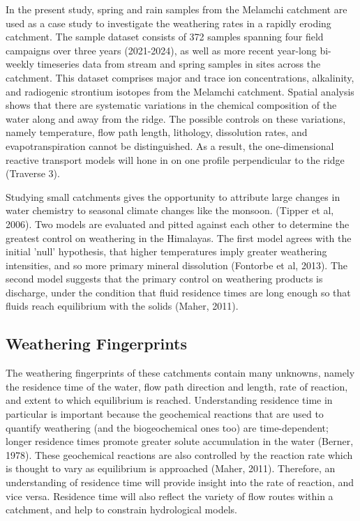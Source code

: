 In the present study, spring and rain samples from the Melamchi catchment are used as a case 
study to investigate the weathering rates in a rapidly eroding catchment. The sample dataset consists of 372 samples spanning four field campaigns over three years (2021-2024), as well as more recent year-long bi-weekly timeseries data from stream and spring samples in sites across the catchment. This dataset comprises major and trace ion concentrations, alkalinity, and radiogenic strontium isotopes from the Melamchi catchment. Spatial analysis shows that there are systematic variations in the chemical composition of the water along and away from the ridge. The possible controls on these variations, namely temperature, flow path length, lithology, dissolution rates, and evapotranspiration cannot be distinguished. As a result, the one-dimensional reactive transport models will hone in on one profile perpendicular to the ridge (Traverse 3). 

\bsk

Studying small catchments gives the opportunity to attribute large changes in water chemistry to seasonal climate changes like the monsoon. (Tipper et al, 2006). Two models are evaluated and pitted against each other to determine the greatest control on weathering in the Himalayas. The first model agrees with the initial 'null' hypothesis, that higher temperatures imply greater weathering intensities, and so more primary mineral dissolution (Fontorbe et al, 2013). The second model suggests that the primary control on weathering products is discharge, under the condition that fluid residence times are long enough so that fluids reach equilibrium with the solids (Maher, 2011).


\subsection{Weathering Fingerprints}

The weathering fingerprints of these catchments contain many unknowns, namely the residence time of the water, flow path direction and length, rate of reaction, and extent to which equilibrium is reached. Understanding residence time in particular is important because the geochemical reactions that are used to quantify weathering (and the biogeochemical ones too) are time-dependent; longer residence times promote greater solute accumulation in the water (Berner, 1978). These geochemical reactions are also controlled by the reaction rate which is thought to vary as equilibrium is approached (Maher, 2011). Therefore, an understanding of residence time will provide insight into the rate of reaction, and vice versa. Residence time will also reflect the variety of flow routes within a catchment, and help to constrain hydrological models.

